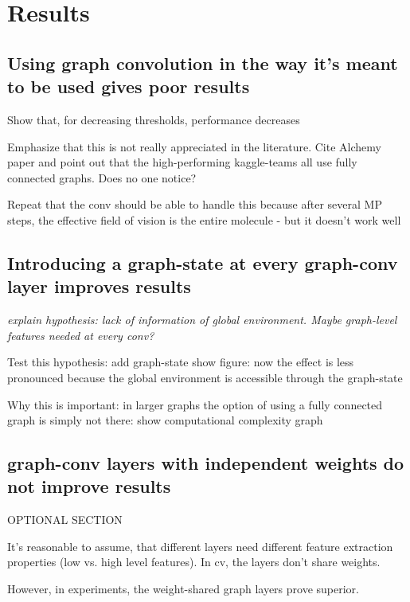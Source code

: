 \chapter{Results}
\label{chapter:Results}

\section{Using graph convolution in the way it's meant to be used gives poor results}

{\itshape

Show that, for decreasing thresholds, performance decreases

Emphasize that this is not really appreciated in the literature.
Cite Alchemy paper and point out that the high-performing kaggle-teams all use fully connected graphs.
Does no one notice?

Repeat that the conv should be able to handle this because after several MP steps, the effective field of vision is the entire molecule - but it doesn't work well


}

\section{Introducing a graph-state at every graph-conv layer improves results}



{\itshape
explain hypothesis:
lack of information of global environment. Maybe graph-level features needed at every conv?

Test this hypothesis:
add graph-state
show figure: now the effect is less pronounced because the global environment is accessible through the graph-state

Why this is important:
in larger graphs the option of using a fully connected graph is simply not there:
show computational complexity graph
}


\section{graph-conv layers with independent weights do not improve results}

{\itshape
	
OPTIONAL SECTION

It's reasonable to assume, that different layers need different feature extraction properties (low vs. high level features). In cv, the layers don't share weights.

However, in experiments, the weight-shared graph layers prove superior.
}

